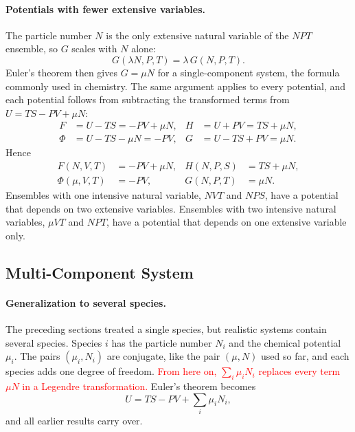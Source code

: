 \paragraph{Potentials with fewer extensive variables.}
The particle number $N$ is the only extensive natural variable of the $NPT$
ensemble, so $G$ scales with $N$ alone:
\begin{equation*}
    G(\lambda N,P,T)=\lambda\,G(N,P,T).
\end{equation*}
Euler's theorem then gives $G=\mu N$ for a single-component system, the
formula commonly used in chemistry. The same argument applies to every
potential, and each potential follows from subtracting the transformed terms
from $U=TS-PV+\mu N$:
\begin{align*}
    F&=U-TS=-PV+\mu N, &H&=U+PV=TS+\mu N,\\
    \Phi&=U-TS-\mu N=-PV, &G&=U-TS+PV=\mu N.
\end{align*}
Hence
\begin{equation}
    \boxed{
    \begin{aligned}
        F(N,V,T)&=-PV+\mu N, &H(N,P,S)&=TS+\mu N,\\
        \Phi(\mu,V,T)&=-PV, &G(N,P,T)&=\mu N.
    \end{aligned}}
\end{equation}
Ensembles with one intensive natural variable, $NVT$ and $NPS$, have a
potential that depends on two extensive variables. Ensembles with two
intensive natural variables, $\mu VT$ and $NPT$, have a potential that
depends on one extensive variable only.

\subsection{Multi-Component System}

\paragraph{Generalization to several species.}
The preceding sections treated a single species, but realistic systems
contain several species. Species $i$ has the particle number $N_i$ and the
chemical potential $\mu_i$. The pairs $(\mu_i,N_i)$ are conjugate, like the
pair $(\mu,N)$ used so far, and each species adds one degree of freedom.
\textcolor{red}{From here on, $\sum_i\mu_iN_i$ replaces every term $\mu N$
in a Legendre transformation.} Euler's theorem becomes
\begin{equation}
    \boxed{U=TS-PV+\sum_i\mu_iN_i,}
\end{equation}
and all earlier results carry over.

